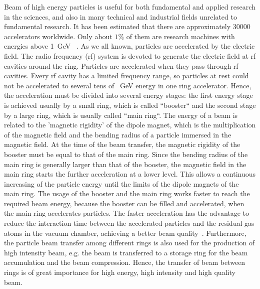%

Beam of high energy particles is useful for both fundamental and applied research in the sciences, and also in many technical and industrial fields unrelated to fundamental research. It has been estimated that there are approximately 30000 accelerators worldwide. Only about $1\%$ of them are research machines with energies above \SI{1}{GeV} ~\cite{_particle_????}.  As we all known, particles are accelerated by the electric field. The radio frequency (rf) system is devoted to generate the electric field at rf cavities around the ring. Particles are accelerated when they pass through rf cavities. Every rf cavity has a limited frequency range,  so particles at rest could not be accelerated to several tens of \SI{}{GeV} energy in one ring accelerator.  Hence, the acceleration must be divided into several energy stages: the first energy stage is achieved usually by a small ring, which is called ``booster`` and the second stage by a large ring, which is usually called ``main ring``.  The energy of a beam is related to the 'magnetic rigidity' of the dipole magnet, which is the multiplication of the magnetic field and the bending radius of a particle immersed in the magnetic field. At the time of the beam transfer, the magnetic rigidity of the booster must be equal to that of the main ring. Since the bending radius of the main ring is generally larger than that of the booster, the magnetic field in the main ring starts the further acceleration at a lower level. This allows a continuous increasing of the particle energy until the limits of the dipole magnets of the main ring. The usage of the booster and the main ring works faster to reach the required beam energy, because the booster can be filled and accelerated, when the main ring accelerates particles. The faster acceleration has the advantage to reduce the interaction time between the accelerated particles and the residual-gas atoms in the vacuum chamber, achieving a better beam quality~\cite{moller_beam-residual_1999}. Furthermore, the particle beam transfer among different rings is also used for the production of high intensity beam, e.g. the beam is transferred to a storage ring for the beam accumulation and the beam compression. Hence, the transfer of beam between rings is of great importance for high energy, high intensity and high quality beam.


